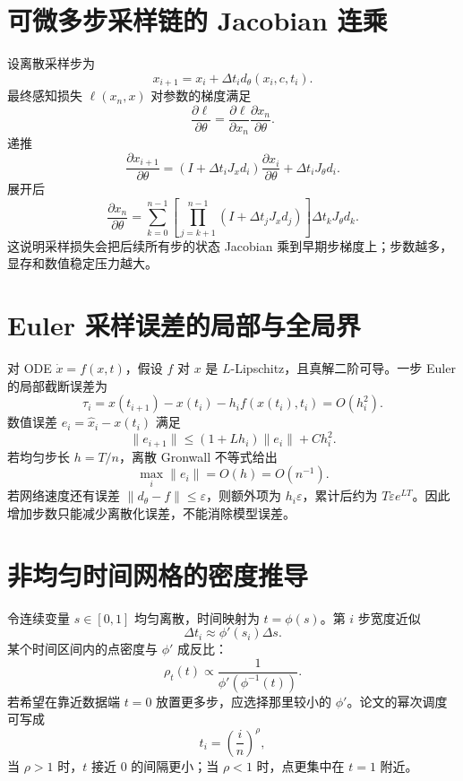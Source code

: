 \documentclass[UTF8,12pt,a4paper,fontset=none]{ctexart}
\numberwithin{equation}{section}
\begin{document}
\section{可微多步采样链的 Jacobian 连乘}
设离散采样步为
\begin{equation}
 x_{i+1}=x_i+\Delta t_i d_\theta(x_i,c,t_i).
\end{equation}
最终感知损失 $\ell(x_n,x)$ 对参数的梯度满足
\begin{equation}
 \frac{\partial\ell}{\partial\theta}
 =\frac{\partial\ell}{\partial x_n}
 \frac{\partial x_n}{\partial\theta}.
\end{equation}
递推
\begin{equation}
 \frac{\partial x_{i+1}}{\partial\theta}
 =\left(I+\Delta t_i J_x d_i\right)
 \frac{\partial x_i}{\partial\theta}
 +\Delta t_i J_\theta d_i.
\end{equation}
展开后
\begin{equation}
 \frac{\partial x_n}{\partial\theta}
 =\sum_{k=0}^{n-1}
 \left[\prod_{j=k+1}^{n-1}
 (I+\Delta t_j J_xd_j)\right]
 \Delta t_k J_\theta d_k.
\end{equation}
这说明采样损失会把后续所有步的状态 Jacobian 乘到早期步梯度上；步数越多，显存和数值稳定压力越大。

\section{Euler 采样误差的局部与全局界}
对 ODE $\dot x=f(x,t)$，假设 $f$ 对 $x$ 是 $L$-Lipschitz，且真解二阶可导。一步 Euler 的局部截断误差为
\begin{equation}
 \tau_i=x(t_{i+1})-x(t_i)-h_i f(x(t_i),t_i)=O(h_i^2).
\end{equation}
数值误差 $e_i=\widehat x_i-x(t_i)$ 满足
\begin{equation}
 \|e_{i+1}\|\le(1+Lh_i)\|e_i\|+C h_i^2.
\end{equation}
若均匀步长 $h=T/n$，离散 Gronwall 不等式给出
\begin{equation}
 \max_i\|e_i\|=O(h)=O(n^{-1}).
\end{equation}
若网络速度还有误差 $\|d_\theta-f\|\le\varepsilon$，则额外项为 $h_i\varepsilon$，累计后约为 $T\varepsilon e^{LT}$。因此增加步数只能减少离散化误差，不能消除模型误差。

\section{非均匀时间网格的密度推导}
令连续变量 $s\in[0,1]$ 均匀离散，时间映射为 $t=\phi(s)$。第 $i$ 步宽度近似
\begin{equation}
 \Delta t_i\approx \phi'(s_i)\Delta s.
\end{equation}
某个时间区间内的点密度与 $\phi'$ 成反比：
\begin{equation}
 \rho_t(t)\propto\frac1{\phi'(\phi^{-1}(t))}.
\end{equation}
若希望在靠近数据端 $t=0$ 放置更多步，应选择那里较小的 $\phi'$。论文的幂次调度可写成
\begin{equation}
 t_i=\left(\frac{i}{n}\right)^\rho,
\end{equation}
当 $\rho>1$ 时，$t$ 接近 $0$ 的间隔更小；当 $\rho<1$ 时，点更集中在 $t=1$ 附近。
\end{document}
